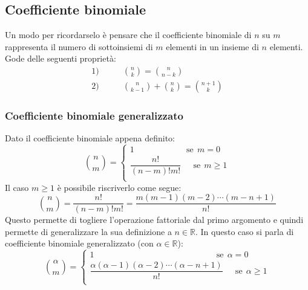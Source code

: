 \subsection{Coefficiente binomiale} \label{sec_coefficiente-binomiale}


Un modo per ricordarselo è pensare che il coefficiente binomiale di $n$ su $m$ rappresenta il numero di sottoinsiemi di $m$ elementi in un insieme di $n$ elementi.\\
Gode delle seguenti proprietà:
\begin{align*}
    1) &\qquad\binom{n}{k} = \binom{n}{n-k}\\[0.2cm]
    2) &\qquad\binom{n}{k-1} + \binom{n}{k} = \binom{n+1}{k}
\end{align*}

\subsubsection{Coefficiente binomiale generalizzato} \label{sec_coefficiente-binomiale-gen}
Dato il coefficiente binomiale appena definito:
\begin{equation*}
\binom{n}{m}=
    \begin{cases}
    1 \qquad \qquad \qquad \, \mathrm{se}\;\, m = 0\\
    \dfrac{n!}{(n-m)!m!} \quad \;\, \mathrm{se}\;\, m \geq 1\\
    \end{cases}
\end{equation*}
Il caso $m \geq 1$ è possibile riscriverlo come segue:
\begin{equation*}
	\binom{n}{m} = \dfrac{n!}{(n-m)!m!} = \dfrac{m (m - 1) (m -2) \cdots (m - n + 1)}{n!}
\end{equation*}
Questo permette di togliere l'operazione fattoriale dal primo argomento e quindi permette di generalizzare la sua definizione a $n \in \mathbb{R}$. In questo caso si parla di coefficiente binomiale generalizzato (con $\alpha \in \mathbb{R}$):
\begin{equation*}
	\binom{\alpha}{m} = 
		\begin{cases}
			1 \qquad \qquad \qquad \qquad \qquad \qquad \qquad \,\; \mathrm{se}\;\, \alpha = 0\\[5pt]
		\dfrac{\alpha (\alpha - 1) (\alpha -2) \cdots (\alpha - n + 1)}{n!} \quad \;\, \mathrm{se}\;\, \alpha \geq 1\\
		\end{cases}
\end{equation*}



